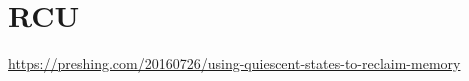 \section{RCU}

\label{sec:concurrency:rcu}

\url{https://preshing.com/20160726/using-quiescent-states-to-reclaim-memory}
